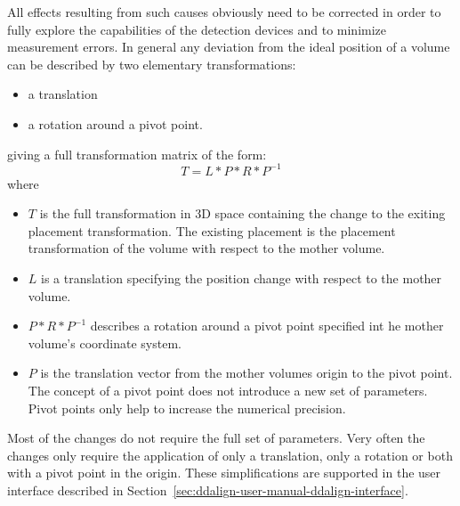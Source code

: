 \documentclass[10pt,a4paper]{article}
\begin{document}
\noindent
All effects resulting from such causes obviously need to be corrected in order to 
fully explore the capabilities of the detection devices and to minimize 
measurement errors. In general any deviation from the ideal position of a volume
can be described by two elementary transformations:
\begin{itemize}\itemcompact
\item a translation
\item a rotation around a pivot point.
\end{itemize}
giving a full transformation matrix of the form:
\begin{equation}
T = L * P * R * P^{-1}
\end{equation}
where 
\begin{itemize}\itemcompact
\item $T$ is the full transformation in 3D space containing the change to the 
exiting placement transformation. The existing placement is the placement 
transformation of the volume with respect to the mother volume.
\item $L$ is a translation specifying the position change with respect to the 
    mother volume.
\item $P * R * P^{-1}$ describes a rotation around a pivot point specified 
    int he mother volume's coordinate system.
\item $P$ is the translation vector from the mother volumes origin to the 
    pivot point. The concept of a pivot point does not introduce a new 
    set of parameters. Pivot points only help to increase the numerical
    precision.
\end{itemize}
Most of the changes do not require the full set of parameters. Very often 
the changes only require the application of only a translation, only a
rotation or both with a pivot point in the origin. These simplifications 
are supported  in the user interface described in 
Section~\ref{sec:ddalign-user-manual-ddalign-interface}.
\end{document}
